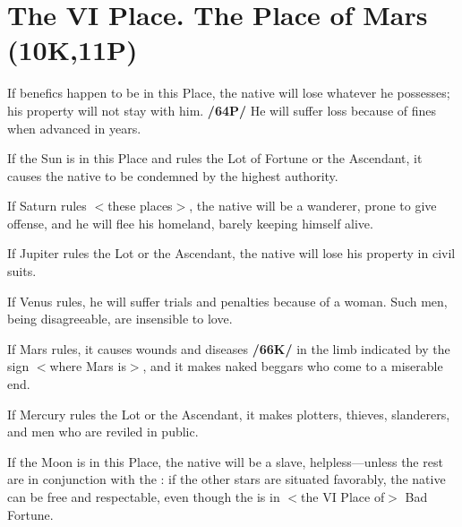 \section{The VI Place. The Place of Mars (10K,11P)}

If benefics happen to be in this Place, the native will lose whatever he possesses; his property will not stay with him. \textbf{/64P/} He will suffer loss because of fines when advanced in years. 

If the Sun is in this Place and rules the Lot of Fortune or the Ascendant, it causes the native to be condemned by the highest authority. 

If Saturn rules $<$these places$>$, the native will be a wanderer, prone to give offense, and he will flee his homeland, barely keeping himself alive. 

If Jupiter rules the Lot or the Ascendant, the native will lose his property in civil suits. 

If Venus rules, he will suffer trials and penalties because of a woman. Such men, being disagreeable, are insensible to love. 

If Mars rules, it causes wounds and diseases \textbf{/66K/} in the limb indicated by the sign $<$where Mars is$>$, and it makes naked beggars who come to a miserable end. 

If Mercury rules the Lot or the Ascendant, it makes plotters, thieves, slanderers, and men who are reviled in
public. 

If the Moon is in this Place, the native will be a slave, helpless—unless the rest are in conjunction with the \Moon: if the other stars are situated favorably, the native can be free and respectable, even though the \Moon\xspace is in $<$the VI Place of$>$ Bad Fortune.

\newpage